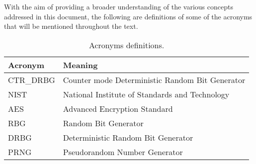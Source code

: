 \noindent
With the aim of providing a broader understanding of the various concepts addressed in this document, the following are definitions of some of the acronyms that will be mentioned throughout the text.

\begin{table}[h!]
\centering
\begin{tabular}{@{}ll@{}}
\toprule
\textbf{Acronym} & \textbf{Meaning} \\ \midrule
CTR\_DRBG & Counter mode Deterministic Random Bit Generator \\
NIST & National Institute of Standards and Technology \\
AES & Advanced Encryption Standard \\
RBG & Random Bit Generator \\
DRBG & Deterministic Random Bit Generator \\
PRNG & Pseudorandom Number Generator \\ \bottomrule
\end{tabular}
\caption{Acronyms definitions.}
\label{tab:acronyms}
\end{table}